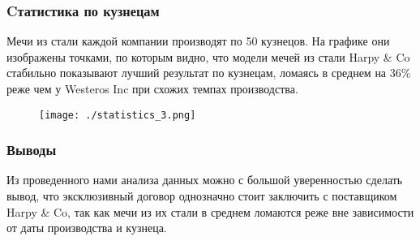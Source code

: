 \documentclass[12pt,pdf,hyperref={unicode}]{beamer}
\begin{document}
\begin{frame}\frametitle{Cтатистика по кузнецам}
Мечи из стали каждой
компании производят по 50
кузнецов. На графике
они изображены точками, по
которым видно, что модели
мечей из стали Harpy \& Co
стабильно показывают лучший
результат по кузнецам, ломаясь
в среднем на 36\% реже чем у Westeros Inc при
схожих темпах производства.

\begin{figure}
		\texttt{[image: ./statistics\_3.png]}
\end{figure}

\end{frame}

\begin{frame}\frametitle{Выводы}
Из проведенного нами анализа данных можно с большой
уверенностью сделать вывод, что эксклюзивный договор однозначно стоит
заключить с поставщиком Harpy \& Co, так как мечи из их
стали в среднем ломаются реже вне зависимости от даты
производства и кузнеца.
\end{frame}
\end{document}
